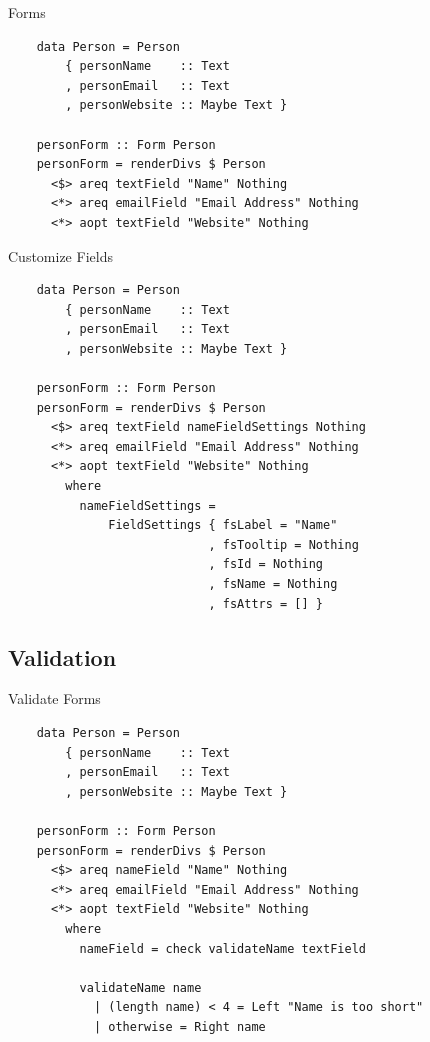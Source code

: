 \documentclass[pdf]{beamer}
\begin{document}
\begin{frame}[fragile]{Forms}
  \begin{verbatim}
    data Person = Person
        { personName    :: Text
        , personEmail   :: Text
        , personWebsite :: Maybe Text }

    personForm :: Form Person
    personForm = renderDivs $ Person
      <$> areq textField "Name" Nothing
      <*> areq emailField "Email Address" Nothing
      <*> aopt textField "Website" Nothing
  \end{verbatim}
\end{frame}

\begin{frame}[fragile]{Customize Fields}
  \begin{verbatim}
    data Person = Person
        { personName    :: Text
        , personEmail   :: Text
        , personWebsite :: Maybe Text }

    personForm :: Form Person
    personForm = renderDivs $ Person
      <$> areq textField nameFieldSettings Nothing
      <*> areq emailField "Email Address" Nothing
      <*> aopt textField "Website" Nothing
        where
          nameFieldSettings =
              FieldSettings { fsLabel = "Name"
                            , fsTooltip = Nothing
                            , fsId = Nothing
                            , fsName = Nothing
                            , fsAttrs = [] }
  \end{verbatim}
\end{frame}

\subsection{Validation}
\begin{frame}[fragile]{Validate Forms}
  \begin{verbatim}
    data Person = Person
        { personName    :: Text
        , personEmail   :: Text
        , personWebsite :: Maybe Text }

    personForm :: Form Person
    personForm = renderDivs $ Person
      <$> areq nameField "Name" Nothing
      <*> areq emailField "Email Address" Nothing
      <*> aopt textField "Website" Nothing
        where
          nameField = check validateName textField

          validateName name
            | (length name) < 4 = Left "Name is too short"
            | otherwise = Right name
  \end{verbatim}
\end{frame}
\end{document}
